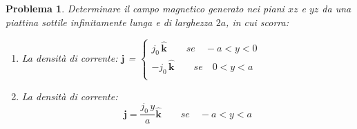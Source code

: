 \documentclass[b5paper,twoside]{book}
\newtheorem{problema}{Problema}
\renewcommand{\vec}[1]{\mathbf{#1}}
\renewcommand{\hat}[1]{\widehat{\mathbf{#1}}}
\begin{document}
\begin{problema}%
	Determinare il campo magnetico generato nei piani 
	$xz$ e $yz$ da una piattina sottile infinitamente 
	lunga e di larghezza $2a$, in cui scorra:
	\begin{enumerate}
		\item La densità di corrente: 
		$\vec{j}$ = $\begin{cases}
		j_{0}\,\hat{k}\qquad se \quad  -a < y < 0	\\
		-j_{0}\,\hat{k}\qquad se \quad  0 < y < a \\
		\end{cases}$
		\item La densità di corrente:
		\begin{equation}
		\vec{j} =\frac{j_{0}\,y}{a}\hat{k} \qquad se \quad  -a < y < a
		\end{equation}
	\end{enumerate}
\end{problema}
\end{document}
